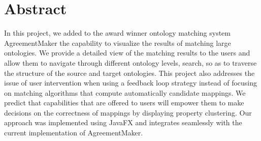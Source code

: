 \section*{Abstract}
In this project, we added to the award winner ontology matching system AgreementMaker the capability to visualize the results of matching large ontologies. We provide a detailed view of the matching results to the users and allow them to navigate through different ontology levels, search, so as to traverse the structure of the source and target ontologies. This project also addresses the issue of user intervention when using a feedback loop strategy instead of focusing on matching algorithms that compute automatically candidate mappings.  We predict that capabilities that are offered to users will empower them to make decisions on the correctness of mappings by displaying property clustering. Our approach was implemented using JavaFX and integrates seamlessly with the current implementation of AgreementMaker. \\[2cm]


